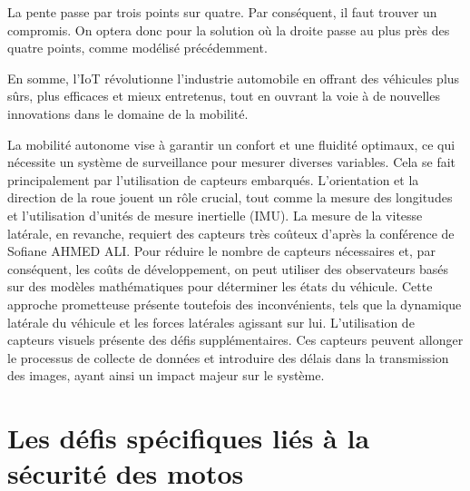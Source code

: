 \documentclass{article}
\begin{document}
La pente passe par trois points sur quatre. Par conséquent, il faut trouver un compromis. On optera donc pour la solution où la droite passe au plus près des quatre points, comme modélisé précédemment. 




En somme, l’IoT révolutionne l’industrie automobile en offrant des véhicules plus sûrs, plus efficaces et mieux entretenus, tout en ouvrant la voie à de nouvelles innovations dans le domaine de la mobilité.

La mobilité autonome vise à garantir un confort et une fluidité optimaux, ce qui nécessite un système de surveillance pour mesurer diverses variables. Cela se fait principalement par l'utilisation de capteurs embarqués.
L'orientation et la direction de la roue jouent un rôle crucial, tout comme la mesure des longitudes et l'utilisation d'unités de mesure inertielle (IMU). La mesure de la vitesse latérale, en revanche, requiert des capteurs très coûteux d'après la conférence\cite{ahmed_ali_synthese_2024} de Sofiane AHMED ALI.
Pour réduire le nombre de capteurs nécessaires et, par conséquent, les coûts de développement, on peut utiliser des observateurs basés sur des modèles mathématiques pour déterminer les états du véhicule. Cette approche prometteuse présente toutefois des inconvénients, tels que la dynamique latérale du véhicule et les forces latérales agissant sur lui.
L'utilisation de capteurs visuels présente des défis supplémentaires. Ces capteurs peuvent allonger le processus de collecte de données et introduire des délais dans la transmission des images, ayant ainsi un impact majeur sur le système.


\newpage
\section{Les défis spécifiques liés à la sécurité des motos}
\end{document}

